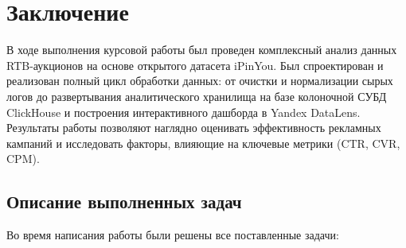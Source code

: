 \section{Заключение}
\label{sec:conclusion}

В ходе выполнения курсовой работы был проведен комплексный анализ данных RTB-аукционов на основе открытого датасета iPinYou. Был спроектирован и реализован полный цикл обработки данных: от очистки и нормализации сырых логов до развертывания аналитического хранилища на базе колоночной СУБД ClickHouse и построения интерактивного дашборда в Yandex DataLens. Результаты работы позволяют наглядно оценивать эффективность рекламных кампаний и исследовать факторы, влияющие на ключевые метрики (CTR, CVR, CPM).

\subsection{Описание выполненных задач}

Во время написания работы были решены все поставленные задачи:

